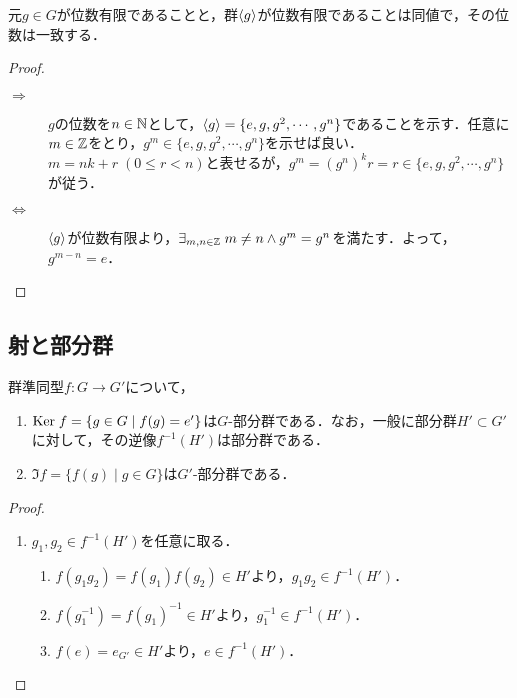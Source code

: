 \documentclass[uplatex,dvipdfmx]{jsreport}
\begin{document}
\begin{lemma}\label{lemma-order-of-element-and-subspace}
    元$g\in G$が位数有限であることと，群$\langle g\rangle$が位数有限であることは同値で，その位数は一致する．
\end{lemma}
\begin{proof}\mbox{}
    \begin{description}
        \item[$\Rightarrow$] $g$の位数を$n\in\mathbb{N}$として，$\langle g\rangle=\{e,g,g^2,\cdots,g^n\}$であることを示す．任意に$m\in\mathbb{Z}$をとり，$g^m\in\{e,g,g^2,\cdots,g^n\}$を示せば良い．$m=nk+r\;(0\le r<n)$と表せるが，$g^m=(g^n)^kr=r\in\{e,g,g^2,\cdots,g^n\}$が従う．
        \item[$\Leftrightarrow$] $\langle g\rangle$が位数有限より，$\exists_{m,n\in\mathbb{Z}}\;m\ne n\land g^m=g^n$を満たす．よって，$g^{m-n}=e$．
    \end{description}
\end{proof}

\subsection{射と部分群}

\begin{proposition}
    群準同型$f:G\to G'$について，
    \begin{enumerate}
        \item $\mathrm{Ker}\; f=\{g\in G\mid f(g)=e'\}$は$G$-部分群である．なお，一般に部分群$H'\subset G'$に対して，その逆像$f^{-1}(H')$は部分群である．
        \item $\Im f=\{f(g)\mid g\in G\}$は$G'$-部分群である．
    \end{enumerate}
\end{proposition}
\begin{proof}\mbox{}
    \begin{enumerate}
        \item $g_1,g_2\in f^{-1}(H')$を任意に取る．
        \begin{enumerate}[1.]
            \item $f(g_1g_2)=f(g_1)f(g_2)\in H'$より，$g_1g_2\in f^{-1}(H')$．
            \item $f(g_1^{-1})=f(g_1)^{-1}\in H'$より，$g_1^{-1}\in f^{-1}(H')$．
            \item $f(e)=e_{G'}\in H'$より，$e\in f^{-1}(H')$．
        \end{enumerate}
    \end{enumerate}
\end{proof}
\end{document}
